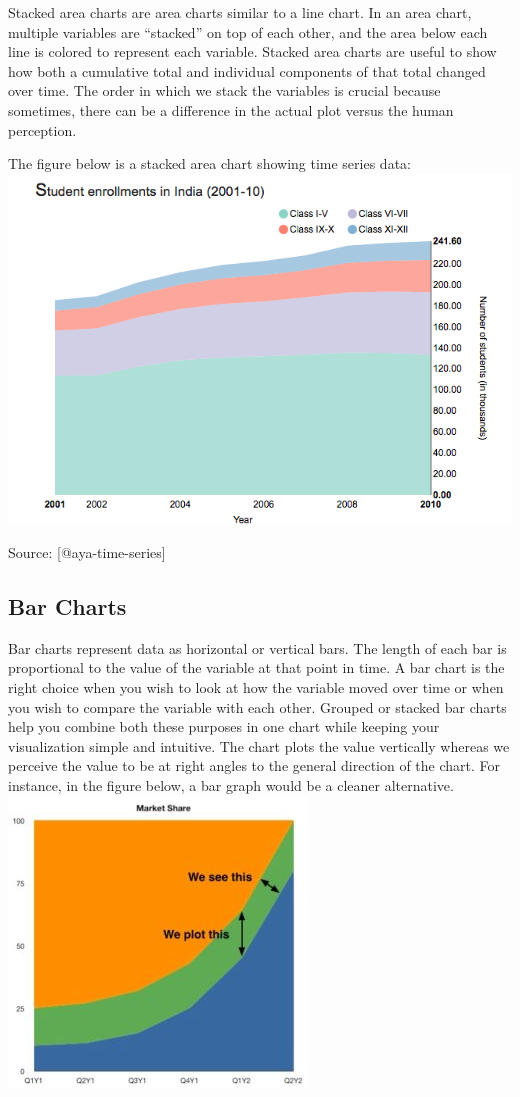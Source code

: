 \documentclass[]{book}
\theoremstyle{definition}
\theoremstyle{definition}
\theoremstyle{definition}
\theoremstyle{remark}
\begin{document}
Stacked area charts are area charts similar to a line chart. In an area
chart, multiple variables are ``stacked'' on top of each other, and the
area below each line is colored to represent each variable. Stacked area
charts are useful to show how both a cumulative total and individual
components of that total changed over time. The order in which we stack
the variables is crucial because sometimes, there can be a difference in
the actual plot versus the human perception.

The figure below is a stacked area chart showing time series data:
\includegraphics{images/aya-stacked.png}

Source: {[}@aya-time-series{]}

\subsection{Bar Charts}\label{bar-charts}

Bar charts represent data as horizontal or vertical bars. The length of
each bar is proportional to the value of the variable at that point in
time. A bar chart is the right choice when you wish to look at how the
variable moved over time or when you wish to compare the variable with
each other. Grouped or stacked bar charts help you combine both these
purposes in one chart while keeping your visualization simple and
intuitive. The chart plots the value vertically whereas we perceive the
value to be at right angles to the general direction of the chart. For
instance, in the figure below, a bar graph would be a cleaner
alternative. \includegraphics{images/aya-stacked-perception.jpg}
\end{document}
